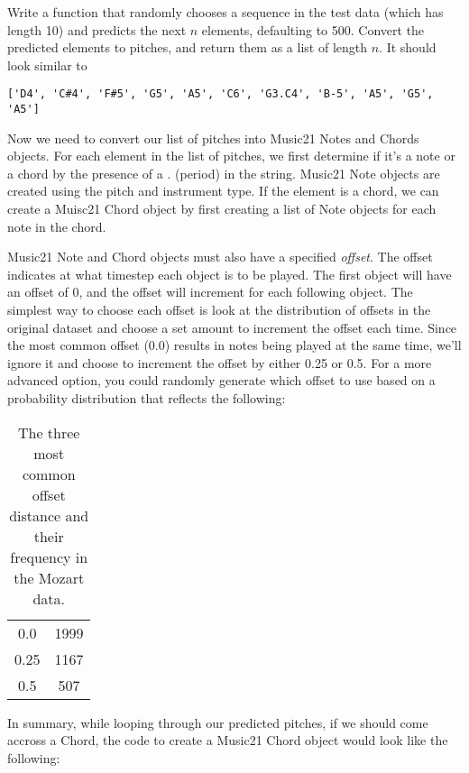 \begin{problem}
Write a function that randomly chooses a sequence in the test data (which has length 10) and predicts the next $n$ elements, defaulting to 500.
Convert the predicted elements to pitches, and return them as a list of length $n$.
It should look similar to

\begin{lstlisting}
['D4', 'C#4', 'F#5', 'G5', 'A5', 'C6', 'G3.C4', 'B-5', 'A5', 'G5', 'A5']
\end{lstlisting}


\label{prob:prediction}
\end{problem}

Now we need to convert our list of pitches into Music21 Notes and Chords objects.
For each element in the list of pitches, we first determine if it's a note or a chord by the presence of a . (period) in the string.
Music21 Note objects are created using the pitch and instrument type.
If the element is a chord, we can create a Muisc21 Chord object by first creating a list of Note objects for each note in the chord.

Music21 Note and Chord objects must also have a specified \emph{offset}.
The offset indicates at what timestep each object is to be played.
The first object will have an offset of 0, and the offset will increment for each following object.
The simplest way to choose each offset is look at the distribution of offsets in the original dataset and choose a set amount to increment the offset each time.
Since the most common offset (0.0) results in notes being played at the same time, we'll ignore it and choose to increment the offset by either 0.25 or 0.5.
For a more advanced option, you could randomly generate which offset to use based on a probability distribution that reflects the following:

\begin{table}[H]
\centering
\begin{tabular}{c|c}
0.0 & 1999\\
0.25 & 1167\\
0.5 & 507\\
\end{tabular}
\caption{The three most common offset distance and their frequency in the Mozart data.}
\end{table}

\noindent In summary, while looping through our predicted pitches, if we should come accross a Chord, the code to create a Music21 Chord object would look like the following:

